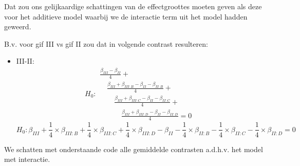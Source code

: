 \documentclass[
  12pt,dutch]{book}
\providecommand{\tightlist}{%
  \setlength{\itemsep}{0pt}\setlength{\parskip}{0pt}}
\theoremstyle{definition}
\theoremstyle{definition}
\theoremstyle{definition}
\theoremstyle{definition}
\theoremstyle{remark}
\begin{document}
Dat zou ons gelijkaardige schattingen van de effectgroottes moeten geven als deze voor het additieve model waarbij we de interactie term uit het model hadden geweerd.

B.v. voor gif III vs gif II zou dat in volgende contrast resulteren:

\begin{itemize}
\tightlist
\item
  III-II:
  \[H_0: 
  \begin{array}{l}
  \frac{\beta_{III}-\beta_{II}}{4} + \\
  \quad \frac{\beta_{III} + \beta_{III:B}-\beta_{II} - \beta_{II:B}}{4} + \\
  \quad \quad \frac{\beta_{III} + \beta_{III:C}-\beta_{II} - \beta_{II:C}}{4} + \\
  \quad \quad \quad \frac{\beta_{III} + \beta_{III:D}-\beta_{II} - \beta_{II:D}}{4}=0
  \end{array}
  \]
  \[
  H_0:\beta_{III} + \frac{1}{4} \times \beta_{III:B} +  \frac{1}{4} \times\beta_{III:C} +  \frac{1}{4} \times\beta_{III:D}
  -\beta_{II} - \frac{1}{4} \times\beta_{II:B} -  \frac{1}{4} \times\beta_{II:C}  - \frac{1}{4} \times\beta_{II:D}=0
  \]
\end{itemize}

We schatten met onderstaande code alle gemiddelde contrasten a.d.h.v. het model met interactie.
\end{document}
